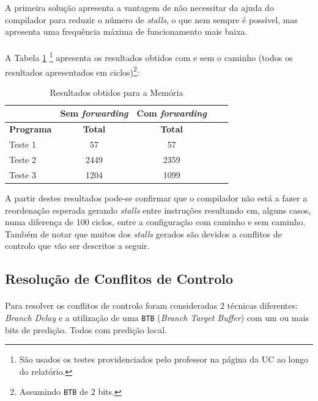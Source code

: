 A primeira solução apresenta a vantagem de não necessitar da ajuda do compilador para reduzir o número de \textit{stalls}, o que nem sempre é possível, mas apresenta uma frequência máxima de funcionamento mais baixa.

\paragraph{} A Tabela \ref{tab:forward} \footnote{São usados os testes providenciados pelo professor na página da UC ao longo do relatório.} apresenta os resultados obtidos com e sem o caminho (todos os resultados apresentados em ciclos)\footnote{Assumindo \texttt{BTB} de 2 bits.}:

\begin{table}[H]
  \caption{Resultados obtidos para a Memória}
  \label{tab:forward}
  \centering  
  \begin{tabular}{| l | c | c | c | c |}
  	\hline
     &
    \multicolumn{1}{c|}{Sem \textit{forwarding}} & 
    \multicolumn{1}{c|}{Com \textit{forwarding}} \\ \hline
    \textbf{Programa} & \textbf{Total} & \textbf{Total} \\ \hline
	Teste 1 & 57   & 57   \\ \hline
    Teste 2 & 2449 & 2359 \\ \hline
    Teste 3 & 1204 & 1099 \\
	\hline
  \end{tabular}
\end{table}

A partir destes resultados pode-se confirmar que o compilador não está a fazer a reordenação esperada gerando \textit{stalls} entre instruções resultando em, alguns casos, numa diferença de 100 ciclos, entre a configuração com caminho e sem caminho. Também de notar que muitos dos \textit{stalls} gerados são devidos a conflitos de controlo que vão ser descritos a seguir.

\subsection{Resolução de Conflitos de Controlo}

\paragraph{} Para resolver os conflitos de controlo foram consideradas 2 técnicas diferentes: \textit{Branch Delay} e a utilização de uma \texttt{BTB} (\textit{Branch Target Buffer}) com um ou mais bits de predição. Todos com predição local.

